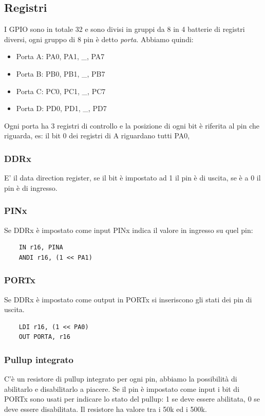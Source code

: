 \subsection{Registri}
I GPIO sono in totale 32 e sono divisi in gruppi da 8 in 4 batterie di registri diversi, ogni gruppo di 8 pin è detto \emph{porta}.
Abbiamo quindi:
\begin{itemize}
    \item Porta A: PA0, PA1, \_, PA7
    \item Porta B: PB0, PB1, \_, PB7
    \item Porta C: PC0, PC1, \_, PC7
    \item Porta D: PD0, PD1, \_, PD7
\end{itemize}

Ogni porta ha 3 registri di controllo e la posizione di ogni bit è riferita al pin che riguarda, es: il bit 0 dei registri di A riguardano tutti PA0,  

\subsubsection{DDRx}
E' il data direction register, se il bit è impostato ad 1 il pin è di uscita, se è a 0 il pin è di ingresso.

\subsubsection{PINx}
Se DDRx è impostato come input PINx indica il valore in ingresso su quel pin:
\begin{verbatim}
    IN r16, PINA
    ANDI r16, (1 << PA1)
\end{verbatim}

\subsubsection{PORTx}
Se DDRx è impostato come output in PORTx si inseriscono gli stati dei pin di uscita.
\begin{verbatim}
    LDI r16, (1 << PA0)
    OUT PORTA, r16
\end{verbatim}

\subsubsection{Pullup integrato}
C'è un resistore di pullup integrato per ogni pin, abbiamo la possibilità di abilitarlo e disabilitarlo a piacere.
Se il pin è impostato come input i bit di PORTx sono usati per indicare lo stato del pullup: 1 se deve essere abilitata, 0 se deve essere disabilitata.
Il resistore ha valore tra i 50k ed i 500k.

